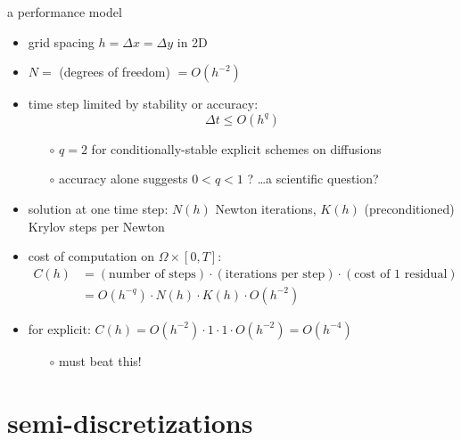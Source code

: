 \documentclass[hide notes,intlimits,usenames,dvipsnames]{beamer}
\begin{document}
\begin{frame}{a performance model}

\begin{itemize}
\item grid spacing $h=\Delta x = \Delta y$ in 2D
\item $N=$ (degrees of freedom) $=O(h^{-2})$ 
\item time step limited by stability or accuracy:
    $$\Delta t \le O(h^q)$$

\vspace{-3mm}
    \begin{itemize}
    \item[$\circ$] $q=2$ for conditionally-stable explicit schemes on diffusions
    \item[$\circ$] accuracy alone suggests $0<q<1$ ? \dots a scientific question?
    \end{itemize}
\item solution at one time step: $N(h)$ Newton iterations, $K(h)$ (preconditioned) Krylov steps per Newton
\item cost of computation on $\Omega \times [0,T]$:
\footnotesize
\begin{align*}
C(h) &= (\text{number of steps}) \cdot (\text{iterations per step}) \cdot (\text{cost of 1 residual}) \\
  &= O(h^{-q}) \cdot N(h) \cdot K(h) \cdot O(h^{-2})
\end{align*}
\normalsize
\item for explicit: $C(h) = O(h^{-2}) \cdot 1 \cdot 1 \cdot O(h^{-2}) = O(h^{-4})$
    \begin{itemize}
    \item[$\circ$] must beat this!
    \end{itemize}
\end{itemize}
\end{frame}


\section{semi-discretizations}
\end{document}

